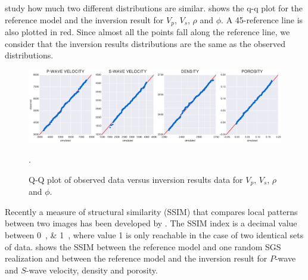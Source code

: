 study how much two different distributions are similar.  shows
the q-q plot for the reference model and the inversion result for $V_p$, $V_s$,
$\rho$ and $\phi$. A \num{45}-reference line is also plotted in red. Since
almost all the points fall along the reference line, we consider that the
inversion results distributions are the same as the observed distributions.
\begin{figure}[!ht]
\centering
\includegraphics[width=1\textwidth]{fig/qqplot.pdf}
\caption{Q-Q plot of observed data versus inversion results data for $V_p$,
$V_s$, $\rho$ and $\phi$.}
\label{fig:qqplot}.
\end{figure}
Recently a measure of structural similarity (SSIM) that compares local patterns
between two images has been developed by \citet{Wang2004}. The SSIM index is a
decimal value between \SIlist{0;1}{}, where value 1 is only reachable in the
case of two identical sets of data.  shows the SSIM between the
reference model and one random SGS realization and between the reference model
and the inversion result for $P$-wave and $S$-wave velocity, density and
porosity.
